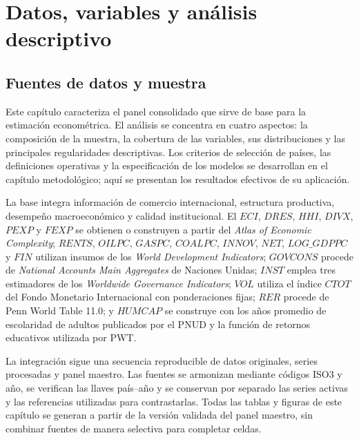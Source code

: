 \documentclass[../../TFM.tex]{subfiles}
\begin{document}

	\chapter{Datos, variables y análisis descriptivo}
	\label{chap:datos-variables}

	\section{Fuentes de datos y muestra}
	\label{sec:fuentes-datos-muestra}

	Este capítulo caracteriza el panel consolidado que sirve de base para la
	estimación econométrica. El análisis se concentra en cuatro aspectos: la
	composición de la muestra, la cobertura de las variables, sus distribuciones
	y las principales regularidades descriptivas. Los criterios de selección de
	países, las definiciones operativas y la especificación de los modelos se
	desarrollan en el capítulo metodológico; aquí se presentan los resultados
	efectivos de su aplicación.

	La base integra información de comercio internacional, estructura
	productiva, desempeño macroeconómico y calidad institucional. El
	$ECI$, $DRES$, $HHI$, $DIVX$, $PEXP$ y
	$FEXP$ se obtienen o construyen a partir del \textit{Atlas of Economic
	Complexity}; $RENTS$, $OILPC$, $GASPC$, $COALPC$, $INNOV$, $NET$,
	$LOG\_GDPPC$ y $FIN$ utilizan insumos de los \textit{World Development
	Indicators}; $GOVCONS$ procede de \textit{National Accounts Main Aggregates}
	de Naciones Unidas; $INST$ emplea tres estimadores de los \textit{Worldwide
	Governance Indicators}; $VOL$ utiliza el índice $CTOT$ del Fondo Monetario
	Internacional con ponderaciones fijas; $RER$ procede de Penn World Table
	11.0; y $HUMCAP$ se construye con los años promedio de escolaridad de adultos
	publicados por el PNUD y la función de retornos educativos utilizada por
	PWT.

	La integración sigue una secuencia reproducible de datos originales, series
	procesadas y panel maestro. Las fuentes se armonizan mediante códigos ISO3 y
	año, se verifican las llaves país--año y se conservan por separado las series
	activas y las referencias utilizadas para contrastarlas. Todas las tablas y
	figuras de este capítulo se generan a partir de la versión validada del panel
	maestro, sin combinar fuentes de manera selectiva para completar celdas.
\end{document}
